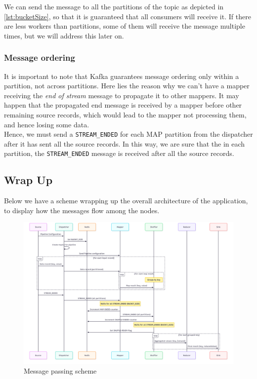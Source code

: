 We can send the message to all the partitions of the topic as depicted in \ref{lst:bucketSize}, so that it is guaranteed that all consumers will receive it. If there are less workers than partitions, some of them will receive the message multiple times, but we will address this later on.

\subsubsection{Message ordering}
It is important to note that Kafka guarantees message ordering only within a partition, not across partitions.
Here lies the reason why we can't have a mapper receiving the \textit{end of stream} message to propagate it to other mappers. It may happen that the propagated end message is received by a mapper before other remaining source records, which would lead to the mapper not processing them, and hence losing some data.\\
Hence, we must send a \lstinline|STREAM_ENDED| for each MAP partition from the dispatcher after it has sent all the source records.
In this way, we are sure that the in each partition, the \lstinline|STREAM_ENDED| message is received after all the source records.

\newpage
\subsection{Wrap Up}
Below we have a scheme wrapping up the overall architecture of the application, to display how the messages flow among the nodes.

\begin{figure}[htbp]
   \centering
   \includegraphics[width=\columnwidth]{images/messagePassing.png}
   \caption{Message passing scheme}
   \label{fig:messagePassing}
\end{figure}

